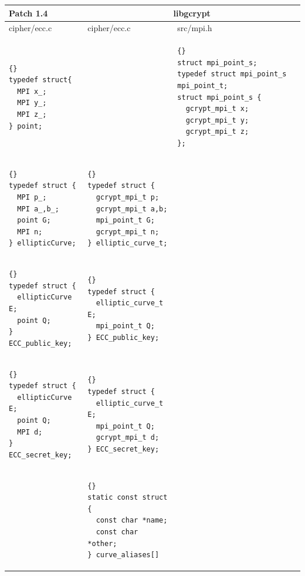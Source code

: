 \documentclass[12pt,twoside,catalan,a4paper]{book}%
\numberwithin{figure}{section}		%
\theoremstyle{definition}   			%
\theoremstyle{saltolinea}   			%
\begin{document}
\begin{table}[H]
\begin{center}
\begin{sideways}
\begin{tabular}{|l||l|l|}
\hline
Patch 1.4 & \multicolumn{2}{c|}{libgcrypt} \\
\hline
 {\sf cipher/ecc.c}     & {\sf cipher/ecc.c} & {\sf src/mpi.h} \\

\hline
 {\tt \begin{lstlisting}{}
typedef struct{
  MPI x_;
  MPI y_;
  MPI z_;
} point; 
 \end{lstlisting} }
 &&
 {\tt \begin{lstlisting}{}
struct mpi_point_s;
typedef struct mpi_point_s mpi_point_t;
struct mpi_point_s {
  gcrypt_mpi_t x;
  gcrypt_mpi_t y;
  gcrypt_mpi_t z;
};
 \end{lstlisting} }\\
\hline
 {\tt \begin{lstlisting}{}
typedef struct {
  MPI p_;
  MPI a_,b_;
  point G;
  MPI n;
} ellipticCurve;
 \end{lstlisting} }
 &
 {\tt \begin{lstlisting}{}
typedef struct {
  gcrypt_mpi_t p;
  gcrypt_mpi_t a,b;
  mpi_point_t G;
  gcrypt_mpi_t n;
} elliptic_curve_t;
 \end{lstlisting} }
 &\\
\hline
 {\tt \begin{lstlisting}{}
typedef struct {
  ellipticCurve E;
  point Q;
} ECC_public_key;
 \end{lstlisting} }
 &
 {\tt \begin{lstlisting}{}
typedef struct {
  elliptic_curve_t E;
  mpi_point_t Q;
} ECC_public_key;
 \end{lstlisting} }
 &\\
\hline
 {\tt \begin{lstlisting}{}
typedef struct {
  ellipticCurve E;
  point Q;
  MPI d;
} ECC_secret_key;
 \end{lstlisting} }
 &
 {\tt \begin{lstlisting}{}
typedef struct {
  elliptic_curve_t E;
  mpi_point_t Q;
  gcrypt_mpi_t d;
} ECC_secret_key;
 \end{lstlisting} }
 &\\
\hline
 &
 {\tt \begin{lstlisting}{}
static const struct {
  const char *name;
  const char *other;
} curve_aliases[]
 \end{lstlisting} }

\end{tabular}
\end{sideways}
\end{center}
\end{table}
\end{document}
